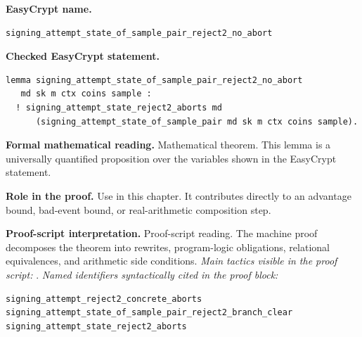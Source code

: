 \begin{formaltheorem}
\noindent\textbf{EasyCrypt name.}
\begin{lstlisting}[language=EasyCrypt,basicstyle=\ttfamily\scriptsize]
signing_attempt_state_of_sample_pair_reject2_no_abort
\end{lstlisting}
\noindent\textbf{Checked EasyCrypt statement.}
\begin{lstlisting}[language=EasyCrypt,basicstyle=\ttfamily\scriptsize]
lemma signing_attempt_state_of_sample_pair_reject2_no_abort
   md sk m ctx coins sample :
  ! signing_attempt_state_reject2_aborts md
      (signing_attempt_state_of_sample_pair md sk m ctx coins sample).
\end{lstlisting}
\noindent\textbf{Formal mathematical reading.}
Mathematical theorem. This lemma is a universally quantified proposition over the variables shown in the EasyCrypt statement.

\noindent\textbf{Role in the proof.}
Use in this chapter. It contributes directly to an advantage bound, bad-event bound, or real-arithmetic composition step.

\noindent\textbf{Proof-script interpretation.}
Proof-script reading. The machine proof decomposes the theorem into rewrites, program-logic obligations, relational equivalences, and arithmetic side conditions.
\emph{Main tactics visible in the proof script:} .
\emph{Named identifiers syntactically cited in the proof block:}
\begin{lstlisting}[language=EasyCrypt,basicstyle=\ttfamily\scriptsize]
signing_attempt_reject2_concrete_aborts
signing_attempt_state_of_sample_pair_reject2_branch_clear
signing_attempt_state_reject2_aborts
\end{lstlisting}

\end{formaltheorem}

